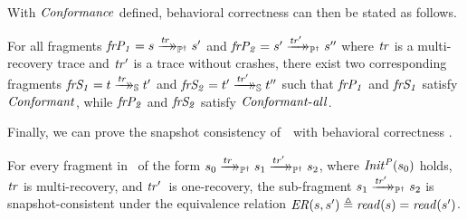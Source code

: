 With $\i{Conformance}$ defined, behavioral correctness can then be stated as follows.

\begin{theorem}   
For all fragments $\i{frP_1} = s \ttsPI{\i{tr}} s'$ and $\i{frP_2} = s' \ttsPI{\i{tr'}} s''$ where $\i{tr}$ is a multi-recovery trace and $\i{tr'}$ is a trace without crashes, there exist two corresponding fragments $\i{frS_1} = t \ttsS{\i{tr}} t'$ and $\i{frS_2} = t' \ttsS{\i{tr'}} t''$ such that $\i{frP_1}$ and $\i{frS_1}$ satisfy $\i{Conformant}$, while $\i{frP_2}$ and $\i{frS_2}$ satisfy $\i{Conformant{\text-}all}$. 
\end{theorem}

Finally, we can prove the snapshot consistency of~\Prog\ with behavioral correctness .

\begin{theorem}
    For every fragment in \ProgInv\ of the form $s_0 \ttsPI{tr} s_1 \ttsPI{tr'} s_2$, where $\id{Init^P}(s_0)$ holds, $\id{tr}$ is multi-recovery, and $\id{tr}'$~is one-recovery, the sub-fragment $s_1 \ttsPI{\id{tr'}} s_2$ is snapshot-consistent under the equivalence relation $\id{ER}(s, s') \defeq \id{read}(s) = \id{read}(s')$.
    
\end{theorem} 